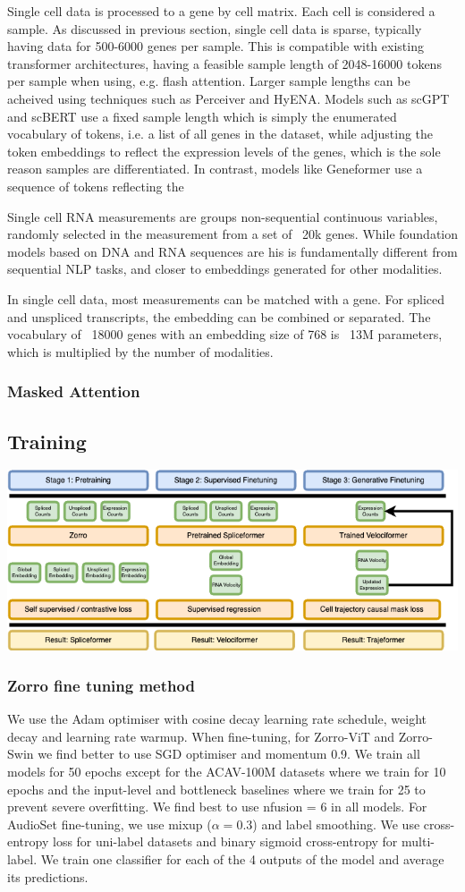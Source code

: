 \documentclass{article} %
\begin{document}
Single cell data is processed to a gene by cell matrix. Each cell is considered a sample. As discussed in previous section, single cell data is sparse, typically having data for 500-6000 genes per sample. This is compatible with existing transformer architectures, having a feasible sample length of 2048-16000 tokens per sample when using, e.g. flash attention. Larger sample lengths can be acheived using techniques such as Perceiver and HyENA. Models such as scGPT and scBERT use a fixed sample length which is simply the enumerated vocabulary of tokens, i.e. a list of all genes in the dataset, while adjusting the token embeddings to reflect the expression levels of the genes, which is the sole reason samples are differentiated. In contrast, models like Geneformer use a sequence of tokens reflecting the 

Single cell RNA measurements are groups non-sequential continuous variables, randomly selected in the measurement from a set of ~20k genes. While foundation models based on DNA and RNA sequences are his is fundamentally different from  sequential NLP tasks, and closer to embeddings generated for other modalities. 

In single cell data, most measurements can be matched with a gene. For spliced and unspliced transcripts, the embedding can be combined or separated. The vocabulary of ~18000 genes with an embedding size of 768 is ~13M parameters, which is multiplied by the number of modalities.
\subsubsection{Masked Attention}
\subsection{Training}
\includegraphics[scale=0.4]{fig1.drawio.png}
\subsubsection{Zorro fine tuning method}
We use the Adam optimiser with cosine
decay learning rate schedule, weight decay and learning rate
warmup. When fine-tuning, for Zorro-ViT and Zorro-Swin
we find better to use SGD optimiser and momentum 0.9. We
train all models for 50 epochs except for the ACAV-100M
datasets where we train for 10 epochs and the input-level and
bottleneck baselines where we train for 25 to prevent severe
overfitting. We find best to use nfusion = 6 in all models.
For AudioSet fine-tuning, we use mixup ($\alpha = 0.3$) and label
smoothing. We use cross-entropy loss for uni-label datasets
and binary sigmoid cross-entropy for multi-label. We train
one classifier for each of the 4 outputs of the model and
average its predictions. 
\end{document}
